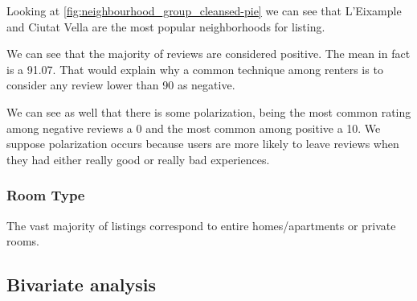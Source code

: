
Looking at \ref{fig:neighbourhood_group_cleansed-pie} we can see that L'Eixample
and Ciutat Vella are the most popular neighborhoods for listing.




We can see that the majority of reviews are considered positive. The mean in fact is 
a 91.07. That would explain why a common technique among renters is to consider 
any review lower than 90 as negative. 

We can see as well that there is some polarization, being the most common rating among 
negative reviews a 0 and the most common among positive a 10. We suppose polarization occurs
because users are more likely to leave reviews when they had either really good or 
really bad experiences.





\pagebreak
\subsubsection{Room Type}


The vast majority of listings correspond to entire homes/apartments or private rooms.

\pagebreak
\subsection{Bivariate analysis}%
\label{sub:bivariate_analysis}


